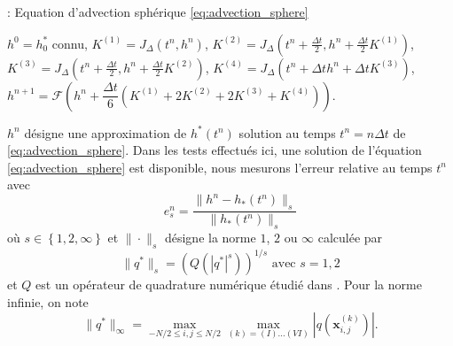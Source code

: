 \begin{center}
\begin{minipage}[H]{12cm}
  \begin{algorithm}[H]
    \caption{: Equation d'advection sphérique \eqref{eq:advection_sphere} }\label{alg:RK4_transportSa}
    \begin{algorithmic}[1]
    \State $h^0 = h_0^*$ connu,
             \State  $K^{(1)} = J_{\Delta}(t^n, h^n)$,
             \State  $K^{(2)} = J_{\Delta}\left(t^n + \frac{\Delta t}{2}, h^n + \frac{\Delta t}{2} K^{(1)} \right)$,
             \State  $K^{(3)} = J_{\Delta}\left(t^n + \frac{\Delta t}{2}, h^n + \frac{\Delta t}{2} K^{(2)} \right)$,
             \State  $K^{(4)} = J_{\Delta}\left(t^n + \Delta t h^n + \Delta t K^{(3)} \right)$,  
             \State  $h^{n+1} = \mathcal{F}\left( h^n  + \dfrac{\Delta t}{6} \left( K^{(1)} + 2 K^{(2)} + 2 K^{(3)} + K^{(4)} \right) \right)$.
            \EndFor
    \end{algorithmic}
    \end{algorithm}
\end{minipage}
\end{center}

$h^n$ désigne une approximation de $h^*(t^n)$ solution au temps $t^n = n \Delta t$ de \eqref{eq:advection_sphere}.
Dans les tests effectués ici, une solution de l'équation \eqref{eq:advection_sphere} est disponible, nous mesurons l'erreur relative au temps $t^n$ avec
\begin{equation}
e_s^n = \dfrac{\| h^n - h_*(t^n) \|_s}{\| h_*(t^n) \|_s}
\end{equation}
où $s \in \left\lbrace 1, 2, \infty \right\rbrace$ et $\| \cdot \|_s$ désigne la norme $1$, $2$ ou $\infty$ calculée par
\begin{equation}
\| q^* \|_s = \left( Q(|q^*|^s ) \right)^{1/s} \text{ avec } s=1,2
\end{equation}
et $Q$ est un opérateur de quadrature numérique étudié dans \cite{Portelenelle2018}. Pour la norme infinie, on note
\begin{equation}
\| q^* \|_{\infty} = \max_{-N/2 \leq i,j \leq N/2} \max_{(k) = (I) ... (VI)} |q(\mathbf{x}_{i,j}^{(k)})|.
\end{equation}
















